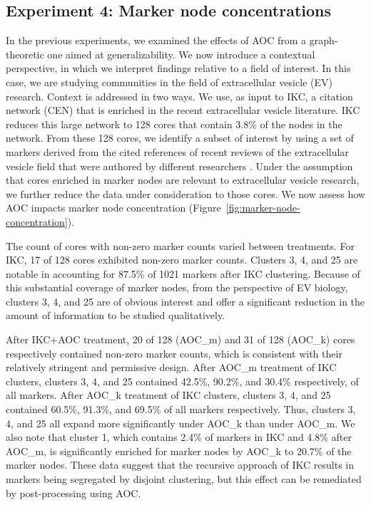 \documentclass[12pt, oneside]{article}   	%
\begin{document}
\subsection{Experiment 4: Marker node concentrations}

In the previous experiments, we examined the effects of AOC from a graph-theoretic one aimed at generalizability. We now introduce a contextual perspective, in which we interpret findings relative to a field of interest. In this case, we are studying communities in the field of extracellular vesicle (EV) research. Context is addressed in two ways. We use, as input to IKC, a citation network (CEN) that is enriched in the recent extracellular vesicle literature. IKC reduces this large network to 128 cores that contain 3.8\% of the nodes in the network. From these 128 cores, we identify a subset of interest by using a set of markers derived from the cited references of recent reviews of the extracellular vesicle field that were authored by different researchers \citep{Wedell2022}. Under the assumption that cores enriched in marker nodes are relevant to extracellular vesicle research, we further reduce the data under consideration to those cores. We now assess how AOC impacts marker node concentration (Figure~\ref{fig:marker-node-concentration}).

The count of cores with non-zero marker counts varied between treatments. For IKC, 17 of 128 cores exhibited  non-zero marker counts. Clusters 3, 4, and 25 are notable in accounting for 87.5\% of 1021 markers after IKC clustering. Because of this substantial coverage of marker nodes, from the perspective of EV biology, clusters 3, 4, and 25 are of obvious interest and offer a significant reduction in the amount of information to be studied qualitatively.  

After IKC+AOC treatment, 20 of 128 (AOC\_m) and 31 of 128 (AOC\_k) cores respectively contained non-zero marker counts, which is consistent with their relatively stringent and permissive design. After AOC\_m treatment of IKC clusters, clusters 3, 4, and 25  contained 42.5\%, 90.2\%, and 30.4\% respectively, of all markers. After AOC\_k treatment of IKC clusters, clusters  3, 4, and 25 contained 60.5\%, 91.3\%, and 69.5\% of all markers respectively.  Thus,  clusters 3, 4, and 25 all expand more significantly under AOC\_k than under AOC\_m. We also note that cluster 1, which contains 2.4\% of markers in IKC and 4.8\% after AOC\_m, is significantly enriched for marker nodes by AOC\_k to 20.7\% of the marker nodes. These data  suggest that the recursive approach of IKC results in markers being segregated by disjoint clustering, but this effect can be remediated by post-processing using AOC.
\end{document}
